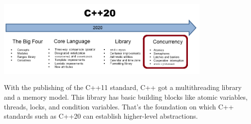 \begin{center}
\includegraphics[width=0.8\textwidth]{content/3/chapter6/images/1.png}\\
\end{center}

With the publishing of the C++11 standard, C++ got a multithreading library and a memory model.
This library has basic building blocks like atomic variables, threads, locks, and condition variables. That’s the foundation on which C++ standards such as C++20 can establish higher-level abstractions.